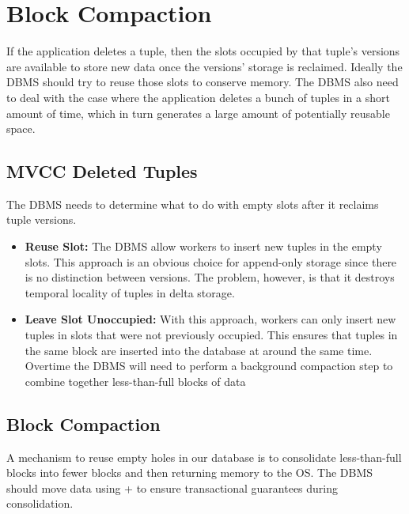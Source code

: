 \documentclass[11pt]{article}
\begin{document}
\section{Block Compaction}
If the application deletes a tuple, then the slots occupied by that tuple's versions are available 
to store new data once the versions' storage is reclaimed. Ideally the DBMS should try to reuse 
those slots to conserve memory. The DBMS also need to deal with the case where the application 
deletes a bunch of tuples in a short amount of time, which in turn generates a large amount of 
potentially reusable space.

\subsection*{MVCC Deleted Tuples}
The DBMS needs to determine what to do with empty slots after it reclaims tuple versions.

\begin{itemize}
    \item \textbf{Reuse Slot:}
    The DBMS allow workers to insert new tuples in the empty slots. This approach is an obvious 
    choice for append-only storage since there is no distinction between versions. The problem, 
    however, is that it destroys temporal locality of tuples in delta storage.

    \item \textbf{Leave Slot Unoccupied:}
    With this approach, workers can only insert new tuples in slots that were not previously 
    occupied. This ensures that tuples in the same block are inserted into the database at around 
    the same time. Overtime the DBMS will need to perform a background compaction step to combine 
    together less-than-full blocks of data 
\end{itemize}

\subsection*{Block Compaction}
A mechanism to reuse empty holes in our database is to consolidate less-than-full blocks into fewer 
blocks and then returning memory to the OS. The DBMS should move data using + 
 to ensure
transactional guarantees during consolidation.
\end{document}

